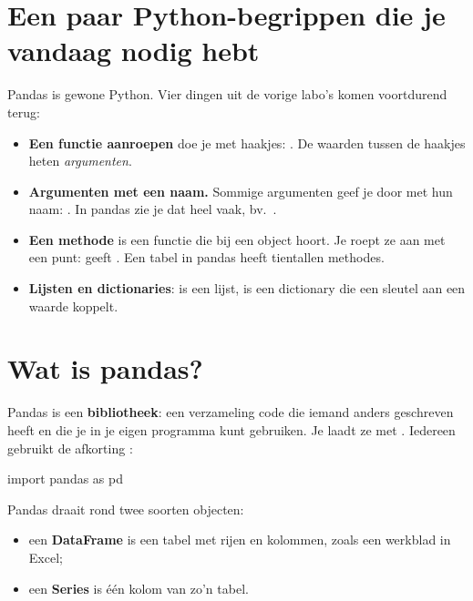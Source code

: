\documentclass[11pt,a4paper]{article}
\begin{document}
\section{Een paar Python-begrippen die je vandaag nodig hebt}

Pandas is gewone Python. Vier dingen uit de vorige labo's komen
voortdurend terug:

\begin{itemize}
  \item \textbf{Een functie aanroepen} doe je met haakjes:
        . De waarden tussen de haakjes heten
        \emph{argumenten}.
  \item \textbf{Argumenten met een naam.} Sommige argumenten geef je
        door met hun naam: . In
        pandas zie je dat heel vaak, bv.\ .
  \item \textbf{Een methode} is een functie die bij een object hoort. Je
        roept ze aan met een punt:  geeft
        . Een tabel in pandas heeft tientallen methodes.
  \item \textbf{Lijsten en dictionaries}:  is
        een lijst,  is een dictionary die een
        sleutel aan een waarde koppelt.
\end{itemize}

\section{Wat is pandas?}

Pandas is een \textbf{bibliotheek}: een verzameling code die iemand
anders geschreven heeft en die je in je eigen programma kunt gebruiken.
Je laadt ze met . Iedereen gebruikt de afkorting :

\begin{python}[noout]
import pandas as pd
\end{python}

Pandas draait rond twee soorten objecten:

\begin{itemize}
  \item een \textbf{DataFrame} is een tabel met rijen en kolommen, zoals
        een werkblad in Excel;
  \item een \textbf{Series} is één kolom van zo'n tabel.
\end{itemize}
\end{document}
